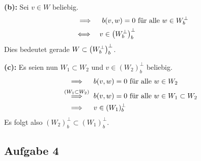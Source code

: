 			\textbf{(b):}
			Sei $v\in W$ beliebig.
			\begin{alignat*}{3}
				&\implies \quad b(v,w) = 0 \text{ für alle } w\in W_b^\perp \\
				&\Longleftrightarrow \quad v \in \left( W_b^\perp \right)_b^\perp
			\end{alignat*}
			Dies bedeutet gerade $W\subset \left( W_b^\perp \right)_b^\perp$.
			\qedbox

			\textbf{(c):}
			Es seien nun $W_1\subset W_2$ und $v\in (W_2)_b^\perp$ beliebig.
			\begin{alignat*}{3}
				&\implies \quad b(v,w) = 0 \text{ für alle } w\in W_2 \\
				&\stackrel{\mathclap{(W_1\subset W_2)}}{\implies} \quad b(v,w) = 0 \text{ für alle } w\in W_1\subset W_2 \\
				&\implies \quad v\in (W_1)_b^\perp
			\end{alignat*}
			Es folgt also $(W_2)_b^\perp \subset (W_1)_b^\perp$.
			\qedbox


		\subsection*{Aufgabe 4} %
		\label{sub:aufgabe_4}
		

